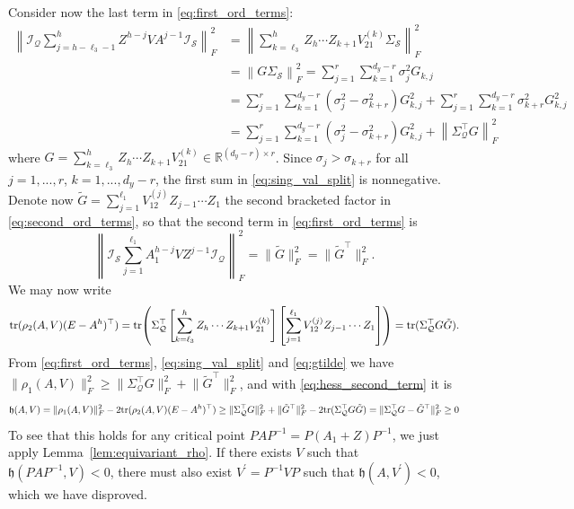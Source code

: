 \documentclass{article}
\makeatletter
\renewenvironment{proof}[1][\proofname]{
  \par\pushQED{\qed}\normalfont
  \topsep6\p@\@plus6\p@\relax
  \trivlist\item[\hskip\labelsep\bfseries#1\@addpunct{.}]
  \ignorespaces
}{
  \popQED\endtrivlist\@endpefalse
}
\def\tr{{\rm tr}}
\newcommand{\1}{\mathds{1}}
\makeatother
\begin{document}
\begin{proof}
    Consider now the last term in \eqref{eq:first_ord_terms}:
    \begin{align}
    	\left\lVert \mathcal{I}_\mathcal{Q} \sum_{j=h-\ell_3-1}^{h} Z^{h-j}VA^{j-1} \mathcal{I}_\mathcal{S} \right\rVert^2_F &= \left\lVert \sum_{k=\ell_3}^{h} Z_h \cdots Z_{k+1} V^{(k)}_{21} \Sigma_\mathcal{S} \right\rVert^2_F  \\
    	&= \left\lVert G \Sigma_\mathcal{S} \right\rVert^2_F = \sum_{j=1}^{r} \sum_{k=1}^{d_y-r} \sigma_j^2 G_{k,j} \\
    	& = \sum_{j=1}^{r} \sum_{k=1}^{d_y-r} (\sigma_j^2 - \sigma_{k+r}^2) G_{k,j}^2 + \sum_{j=1}^{r} \sum_{k=1}^{d_y-r} \sigma_{k+r}^2 G_{k,j}^2 \\
    	& = \sum_{j=1}^{r} \sum_{k=1}^{d_y-r} (\sigma_j^2 - \sigma_{k+r}^2) G_{k,j}^2 + \left\lVert \Sigma_\mathcal{Q}^\top G \right\rVert^2_F \label{eq:sing_val_split}
    \end{align}
    where $G= \sum_{k=\ell_3}^{h} Z_h \cdots Z_{k+1}V^{(k)}_{21} \in \mathbb{R}^{(d_y-r)\times r} $. Since $\sigma_j > \sigma_{k+r}$ for all $j=1,...,r$, $k=1,...,d_y-r$, the first sum in \eqref{eq:sing_val_split} is nonnegative. Denote now $ \tilde{G} = \sum_{j=1}^{\ell_1} V^{(j)}_{12}Z_{j-1} \cdots Z_{1} $ the second bracketed factor in \eqref{eq:second_ord_terms}, so that the second term in \eqref{eq:first_ord_terms} is
    \begin{equation}
    	\left \lVert \mathcal{I}_\mathcal{S} \sum_{j=1}^{\ell_1} A_1^{h-j} V Z^{j-1} \mathcal{I}_\mathcal{Q} \right \rVert_F^2= \lVert \tilde{G} \rVert_F^2 = \lVert \tilde{G}^\top \rVert_F^2. \label{eq:gtilde}
    \end{equation}
     We may now write
    \begin{equation}
    	\tr{(\rho_2(A,V)(E-A^h)^\top)} = \tr{ \left( \Sigma_\mathcal{Q}^\top \left[ \sum_{k=\ell_3}^{h} Z_h \cdots Z_{k+1}V^{(k)}_{21} \right]\left[ \sum_{j=1}^{\ell_1} V^{(j)}_{12} Z_{j-1}\cdots Z_{1} \right] \right)} = \tr{( \Sigma_\mathcal{Q}^\top G \tilde{G})}. \label{eq:hess_second_term}
    \end{equation}
    From \eqref{eq:first_ord_terms}, \eqref{eq:sing_val_split} and \eqref{eq:gtilde} we have $\lVert \rho_1(A,V)  \rVert_F^2 \geq \lVert \Sigma_\mathcal{Q}^\top G \rVert_F^2 + \lVert \tilde{G}^\top \rVert_F^2$, and with \eqref{eq:hess_second_term} it is
    \begin{equation*}
    	\mathfrak{h}(A,V) = \lVert \rho_1(A,V)  \rVert_F^2 - 2\tr{(\rho_2(A,V)(E-A^h)^\top)} \geq \lVert \Sigma_\mathcal{Q}^\top G \rVert_F^2 + \lVert \tilde{G}^\top \rVert_F^2 - 2\tr{( \Sigma_\mathcal{Q}^\top G \tilde{G})} = \lVert \Sigma_\mathcal{Q}^\top G - \tilde{G}^\top \rVert_F^2 \geq 0
    \end{equation*}
    To see that this holds for any critical point $PAP^{-1}=P(A_1+Z)P^{-1}$, we just apply Lemma~\ref{lem:equivariant_rho}. If there exists $V$ such that $ \mathfrak{h}(PAP^{-1},V) < 0 $, there must also exist $ V^\prime =P^{-1}VP$ such that $\mathfrak{h}(A, V^\prime )<0$, which we have disproved.
\end{proof}
\end{document}
